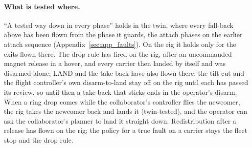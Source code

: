 \paragraph{What is tested where.} ``A tested way down in every phase'' holds in the twin, where every fall-back
above has been flown from the phase it guards, the attach phases on the earlier attach sequence
(Appendix~\ref{sec:app_faults}). On the rig it holds only for the
exits flown there. The drop rule has fired on the rig, after an uncommanded magnet release in a hover, and every
carrier then landed by itself and was disarmed alone; LAND and the take-back have also flown there; the tilt cut and the flight controller's own
disarm-to-land stay off on the rig until each has passed its review, so until then a take-back that sticks ends in
the operator's disarm. When a ring drop comes while the collaborator's controller flies the newcomer, the rig takes
the newcomer back and lands it (twin-tested), and the operator can ask the collaborator's planner to land it straight
down. Redistribution after a release has flown on the rig; the policy for a true fault on a carrier stays the fleet
stop and the drop rule.
